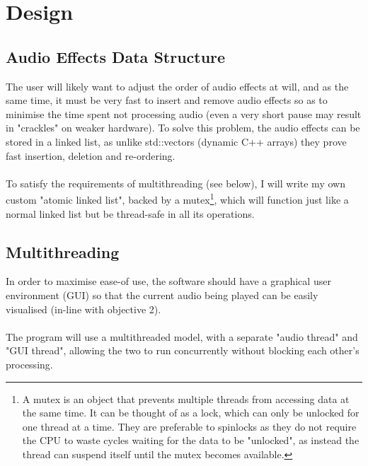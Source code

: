 \section { Design }

\subsection{Audio Effects Data Structure}
The user will likely want to adjust the order of audio effects at will, and as the same time, it must be very fast to insert and  remove audio effects so as to minimise the time spent not processing audio (even a very short pause may result in "crackles" on weaker hardware). To solve this problem, the audio effects can be stored in a linked list, as unlike std::vectors (dynamic C++ arrays) they prove fast insertion, deletion and re-ordering.

\paragraph{}
To satisfy the requirements of multithreading (see below), I will write my own custom "atomic linked list", backed by a mutex\footnote{
	A mutex is an object that prevents multiple threads from accessing data at the same time. It can be thought of as a lock, which can only be unlocked for one thread at a time. They are preferable to spinlocks as they do not require the CPU to waste cycles waiting for the data to be "unlocked", as instead the thread can suspend itself until the mutex becomes available.
}, which will function just like a normal linked list but be thread-safe in all its operations.

\subsection{Multithreading}
In order to maximise ease-of use, the software should have a graphical user environment (GUI) so that the current audio being played can be easily visualised (in-line with objective 2).

\paragraph{}
The program will use a multithreaded model, with a separate "audio thread" and "GUI thread", allowing the two to run concurrently without blocking each other's processing.

